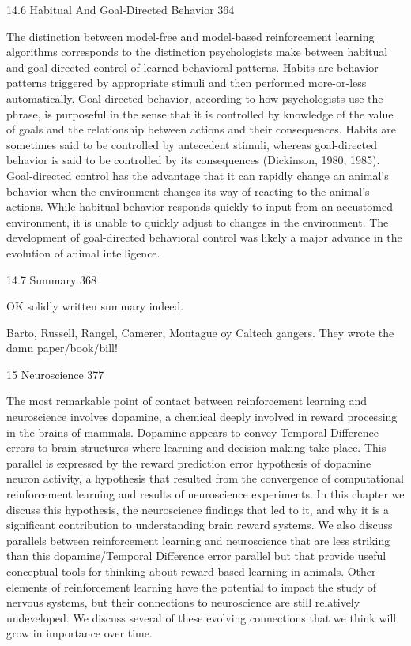 14.6 Habitual And Goal-Directed Behavior 364

The distinction between model-free and model-based reinforcement learning algorithms corresponds to the distinction psychologists make between habitual and goal-directed control of learned behavioral patterns. Habits are behavior patterns triggered by appropriate stimuli and then performed more-or-less automatically. Goal-directed behavior, according to how psychologists use the phrase, is purposeful in the sense that it is controlled by knowledge of the value of goals and the relationship between actions and their consequences. Habits are sometimes said to be controlled by antecedent stimuli, whereas goal-directed behavior is said to be controlled by its consequences (Dickinson, 1980, 1985). Goal-directed control has the advantage that it can rapidly change an animal's behavior when the environment changes its way of reacting to the animal's actions. While habitual behavior responds quickly to input from an accustomed environment, it is unable to quickly adjust to changes in the environment. The development of goal-directed behavioral control was likely a major advance in the evolution of animal intelligence.

14.7 Summary 368

OK solidly written summary indeed.

Barto, Russell, Rangel, Camerer, Montague oy Caltech gangers. They wrote the damn paper/book/bill!

15 Neuroscience 377

The most remarkable point of contact between reinforcement learning and neuroscience involves dopamine, a chemical deeply involved in reward processing in the brains of mammals. Dopamine appears to convey Temporal Difference errors to brain structures where learning and decision making take place. This parallel is expressed by the reward prediction error hypothesis of dopamine neuron activity, a hypothesis that resulted from the convergence of computational reinforcement learning and results of neuroscience experiments. In this chapter we discuss this hypothesis, the neuroscience findings that led to it, and why it is a significant contribution to understanding brain reward systems. We also discuss parallels between reinforcement learning and neuroscience that are less striking than this dopamine/Temporal Difference error parallel but that provide useful conceptual tools for thinking about reward-based learning in animals. Other elements of reinforcement learning have the potential to impact the study of nervous systems, but their connections to neuroscience are still relatively undeveloped. We discuss several of these evolving connections that we think will grow in importance over time.


